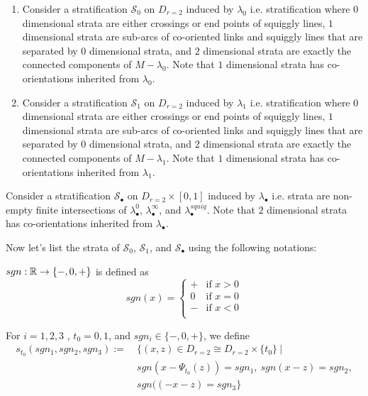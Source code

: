 \begin{definition}
\begin{enumerate}
\item Consider a stratification $\mathcal{S}_0$ on $D_{r=2}$ induced by $\lambda_0$ i.e. stratification where $0$ dimensional strata are either crossings or end points of squiggly lines, $1$ dimensional strata are sub-arcs of co-oriented links and squiggly lines that are separated by $0$ dimensional strata, and $2$ dimensional strata are exactly the connected components of $M-\lambda_0$. Note that $1$ dimensional strata has co-orientations inherited from $\lambda_0$.

\item Consider a stratification $\mathcal{S}_1$ on $D_{r=2}$ induced by $\lambda_1$ i.e. stratification where $0$ dimensional strata are either crossings or end points of squiggly lines, $1$ dimensional strata are sub-arcs of co-oriented links and squiggly lines that are separated by $0$ dimensional strata, and $2$ dimensional strata are exactly the connected components of $M-\lambda_1$. Note that $1$ dimensional strata has co-orientations inherited from $\lambda_1$.
\end{enumerate}

\item Consider a stratification $\mathcal{S}_\bullet$ on $D_{r=2}\times [0,1]$ induced by $\lambda_\bullet$ i.e. strata are non-empty finite intersections of $\lambda_\bullet^0$, $\lambda_\bullet^\infty$, and $\lambda_\bullet^{squig}$. Note that $2$ dimensional strata has co-orientations inherited from $\lambda_\bullet$.
\end{definition}

Now let's list the strata of $\mathcal{S}_0$, $\mathcal{S}_1$, and $\mathcal{S}_\bullet$ using the following notations:
\begin{definition}
$sgn : \mathbb{R} \rightarrow \{-,0,+ \}$ is defined as 
\[sgn(x)=\left\{
\begin{array}{ll}
    + & \text{if } x > 0 \\
    0 & \text{if } x = 0 \\
	- & \text{if } x < 0 \\
\end{array}
\right.
\]
\end{definition}

\begin{definition}
For $i = 1,2,3$ , $t_0 = 0,1$, and $sgn_i \in \{-,0,+\}$, we define
\begin{align*}
s_{t_0}(sgn_1,sgn_2,sgn_3):=~ &\{(x,z) \in D_{r=2}\cong D_{r=2}\times \{t_0\} ~| \\
&sgn(x-\Psi_{t_0}(z))=sgn_1,~ sgn(x-z)=sgn_2,\\ 
&sgn((-x-z)=sgn_3\}
\end{align*}
\end{definition}

